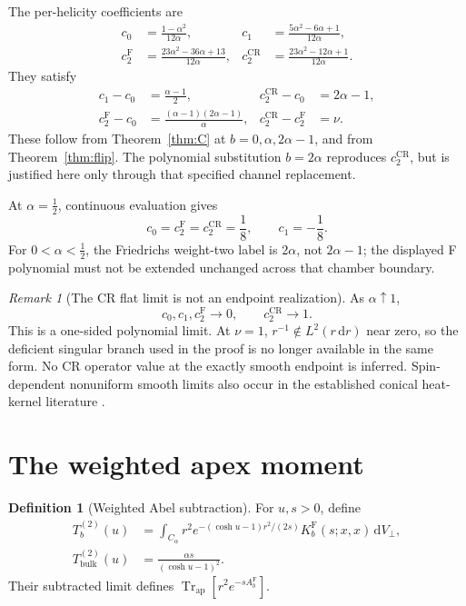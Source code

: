 \documentclass[11pt,a4paper]{article}
\newcommand{\dd}{\mathrm d}
\newcommand{\Fr}{\mathrm F}
\newcommand{\CR}{\mathrm{CR}}
\newcommand{\ApTr}{\operatorname{Tr}_{\mathrm{ap}}}
\theoremstyle{plain}
\theoremstyle{definition}
\newtheorem{definition}[theorem]{Definition}
\theoremstyle{remark}
\newtheorem{remark}[theorem]{Remark}
\numberwithin{equation}{section}
\begin{document}
The per-helicity coefficients are
\begin{align}
 c_0&=\frac{1-\alpha^2}{12\alpha},&
 c_1&=\frac{5\alpha^2-6\alpha+1}{12\alpha},\nonumber\\
 c_2^\Fr&=\frac{23\alpha^2-36\alpha+13}{12\alpha},&
 c_2^\CR&=\frac{23\alpha^2-12\alpha+1}{12\alpha}.
 \label{eq:cvalues}
\end{align}
They satisfy
\begin{align}
 c_1-c_0&=\frac{\alpha-1}{2},&
 c_2^\CR-c_0&=2\alpha-1,\nonumber\\
 c_2^\Fr-c_0&=\frac{(\alpha-1)(2\alpha-1)}{\alpha},&
 c_2^\CR-c_2^\Fr&=\nu.
 \label{eq:cdifferences}
\end{align}
These follow from Theorem~\ref{thm:C} at
\(b=0,\alpha,2\alpha-1\), and from Theorem~\ref{thm:flip}.
The polynomial substitution \(b=2\alpha\) reproduces
\(c_2^\CR\), but is justified here only through that specified
channel replacement.

At \(\alpha=\tfrac12\), continuous evaluation gives
\[
 c_0=c_2^\Fr=c_2^\CR=\frac18,\qquad c_1=-\frac18.
\]
For \(0<\alpha<\tfrac12\), the Friedrichs weight-two label is
\(2\alpha\), not \(2\alpha-1\); the displayed F polynomial must
not be extended unchanged across that chamber boundary.

\begin{remark}[The CR flat limit is not an endpoint realization]
\label{rem:flat}
As \(\alpha\uparrow1\),
\[
 c_0,c_1,c_2^\Fr\longrightarrow0,\qquad c_2^\CR\longrightarrow1.
\]
This is a one-sided polynomial limit. At \(\nu=1\),
\(r^{-1}\notin L^2(r\,\dd r)\) near zero, so the deficient
singular branch used in the proof is no longer available in
the same form. No CR operator value at the exactly smooth
endpoint is inferred. Spin-dependent nonuniform smooth limits
also occur in the established conical heat-kernel literature
\cite{FursaevMiele}.
\end{remark}

\section{The weighted apex moment}
\label{sec:weighted}

\begin{definition}[Weighted Abel subtraction]
For \(u,s>0\), define
\begin{align*}
 T_b^{(2)}(u)
 &=\int_{C_\alpha}r^2
 e^{-(\cosh u-1)r^2/(2s)}
 K_b^\Fr(s;x,x)\,\dd V_\perp,\\
 T_{\mathrm{bulk}}^{(2)}(u)
 &=\frac{\alpha s}{(\cosh u-1)^2}.
\end{align*}
Their subtracted limit defines
\(\ApTr[r^2e^{-sA_b^\Fr}]\).
\end{definition}
\end{document}
